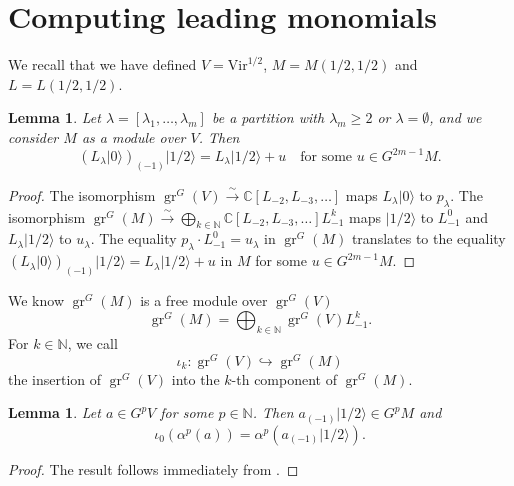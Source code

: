 \documentclass[a4paper, 12pt, reqno]{amsart}
\newtheorem{lemma}[theorem]{Lemma}
\theoremstyle{remark}
\DeclareMathOperator{\gr}{gr}
\newcommand{\vac}{{|0\rangle}}
\newcommand{\vachalf}{{|1/2\rangle}}
\newcommand{\Vir}{{\mathrm{Vir}}}
\begin{document}
\section{Computing leading monomials}
\label{sec:comp-lead-monom}

We recall that we have defined $V = \Vir^{1/2}$, $M = M(1/2, 1/2)$ and $L = L(1/2, 1/2)$.

\begin{lemma}
  \label{lmm:7}
  Let $\lambda = [\lambda_1, \dots, \lambda_m]$ be a partition with $\lambda_m \ge 2$ or $\lambda = \emptyset$, and we consider $M$ as a module over $V$.
  Then
  \begin{equation*}
    (L_{\lambda}\vac)_{(-1)}\vachalf = L_{\lambda}\vachalf + u \quad \text{for some $u \in G^{2m - 1}M$}.
  \end{equation*}
\end{lemma}

\begin{proof}
  The isomorphism $\gr^G(V) \xrightarrow{\sim} \mathbb{C}[L_{-2}, L_{-3}, \dots]$ maps $L_{\lambda}\vac$ to $p_{\lambda}$.
  The isomorphism $\gr^G(M) \xrightarrow{\sim} \bigoplus_{k \in \mathbb{N}}\mathbb{C}[L_{-2}, L_{-3}, \dots]L_{-1}^k$ maps $\vachalf$ to $L_{-1}^0$ and $L_{\lambda}\vachalf$ to $u_{\lambda}$.
  The equality $p_{\lambda}\cdot L_{-1}^0 = u_{\lambda}$ in $\gr^G(M)$ translates to the equality $(L_{\lambda}\vac)_{(-1)}\vachalf = L_{\lambda}\vachalf + u$ in $M$ for some $u \in G^{2m - 1}M$.
\end{proof}

We know $\gr^G(M)$ is a free module over $\gr^G(V)$
\begin{equation*}
  \gr^G(M) = \bigoplus_{k \in \mathbb{N}}\gr^G(V)L_{-1}^k.
\end{equation*}
For $k \in \mathbb{N}$, we call
\begin{equation*}
  \iota_k: \gr^G(V) \hookrightarrow \gr^G(M)
\end{equation*}
the insertion of $\gr^G(V)$ into the $k$-th component of $\gr^G(M)$.

\begin{lemma}
  \label{lmm:8}
  Let $a \in G^pV$ for some $p \in \mathbb{N}$.
  Then $a_{(-1)}\vachalf \in G^pM$ and
  \begin{equation*}
    \iota_0(\alpha^p(a)) = \alpha^p(a_{(-1)}\vachalf).
  \end{equation*}
\end{lemma}

\begin{proof}
  The result follows immediately from .
\end{proof}
\end{document}
